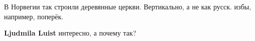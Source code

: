  
 
 
 
 

В Норвегии так строили деревянные церкви. Вертикально, а не как русск. избы,
например, поперёк.

\textbf{Ljudmila Luist} интересно, а почему так?
